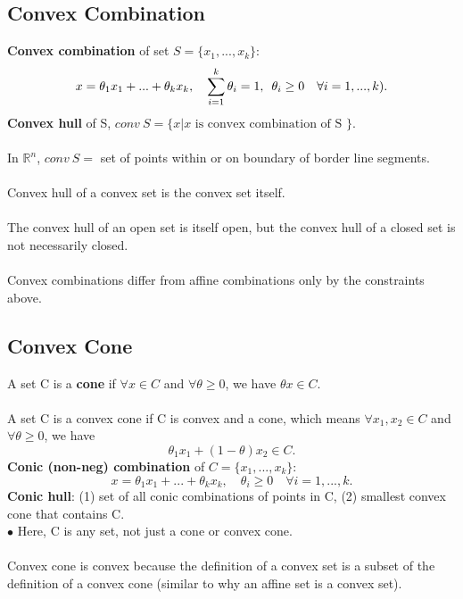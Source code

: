 \documentclass[]{article}
\begin{document}
\subsection*{Convex Combination}
\textbf{Convex combination} of set $S=\{x_{1},...,x_{k}\}$: $$x=\theta_{1} x_{1} + ... + \theta_{k} x_{k}, \quad  \sum_{i=1}^{k} \theta_{i}=1 , \enskip \theta_{i} \geq 0 \quad \forall i=1,...,k).$$
\textbf{Convex hull} of S, $conv \ S=\{x|x \text{ is convex combination of S }\}.$ \\\\
In $\mathbb{R}^{n}$, $conv \ S =$ set of points within or on boundary of border line segments. \\\\
Convex hull of a convex set is the convex set itself. \\\\
The convex hull of an open set is itself open, but the convex hull of a closed set is not necessarily closed. \\\\
Convex combinations differ from affine combinations only by the constraints above. \\

\subsection*{Convex Cone}
A set C is a \textbf{cone} if $\forall x \in C$ and $\forall \theta \geq 0$, we have $\theta x \in C.$ \\\\
A set C is a convex cone if C is convex and a cone, which means $\forall x_{1}, x_{2} \in C$ and $\forall \theta \geq 0$, we have $$\theta_{1} x_{1} + (1-\theta) x_{2} \in C.$$
\textbf{Conic (non-neg) combination} of $C=\{x_{1},..., x_{k}\}:$ $$x=\theta_1 x_{1} + ... + \theta_k x_{k}, \quad \theta_i \geq 0 \quad \forall i=1,..., k.$$
\textbf{Conic hull}: (1) set of all conic combinations of points in C, (2) smallest convex cone that contains C.\\
$\bullet$ Here, C is any set, not just a cone or convex cone. \\\\
Convex cone is convex because the definition of a convex set is a subset of the definition of a convex cone (similar to why an affine set is a convex set). \\
\end{document}
